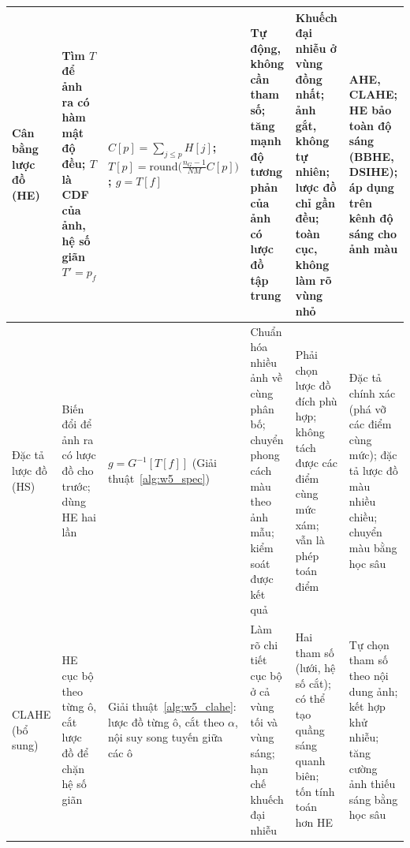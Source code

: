 \begin{table}[!htbp]
\begin{tabularx}{\textwidth}{|p{1.45cm}|p{2.2cm}|p{2.35cm}|X|X|X|}
\hline
Cân bằng lược đồ (HE) & Tìm $T$ để ảnh ra có hàm mật độ đều; $T$ là CDF của ảnh, hệ số giãn $T' = p_f$ & $C[p] = \sum_{j \le p} H[j]$; \newline $T[p] = \mathrm{round}\big(\frac{n_G - 1}{NM}C[p]\big)$; \newline $g = T[f]$ & Tự động, không cần tham số; tăng mạnh độ tương phản của ảnh có lược đồ tập trung & Khuếch đại nhiễu ở vùng đồng nhất; ảnh gắt, không tự nhiên; lược đồ chỉ gần đều; toàn cục, không làm rõ vùng nhỏ & AHE, CLAHE; HE bảo toàn độ sáng (BBHE, DSIHE); áp dụng trên kênh độ sáng cho ảnh màu \\
\hline
Đặc tả lược đồ (HS) & Biến đổi để ảnh ra có lược đồ cho trước; dùng HE hai lần & $g = G^{-1}[T[f]]$ (Giải thuật~\ref{alg:w5_spec}) & Chuẩn hóa nhiều ảnh về cùng phân bố; chuyển phong cách màu theo ảnh mẫu; kiểm soát được kết quả & Phải chọn lược đồ đích phù hợp; không tách được các điểm cùng mức xám; vẫn là phép toán điểm & Đặc tả chính xác (phá vỡ các điểm cùng mức); đặc tả lược đồ màu nhiều chiều; chuyển màu bằng học sâu \\
\hline
CLAHE (bổ sung) & HE cục bộ theo từng ô, cắt lược đồ để chặn hệ số giãn & Giải thuật~\ref{alg:w5_clahe}: lược đồ từng ô, cắt theo $\alpha$, nội suy song tuyến giữa các ô & Làm rõ chi tiết cục bộ ở cả vùng tối và vùng sáng; hạn chế khuếch đại nhiễu & Hai tham số (lưới, hệ số cắt); có thể tạo quầng sáng quanh biên; tốn tính toán hơn HE & Tự chọn tham số theo nội dung ảnh; kết hợp khử nhiễu; tăng cường ảnh thiếu sáng bằng học sâu \\
\hline
\end{tabularx}
\end{table}
